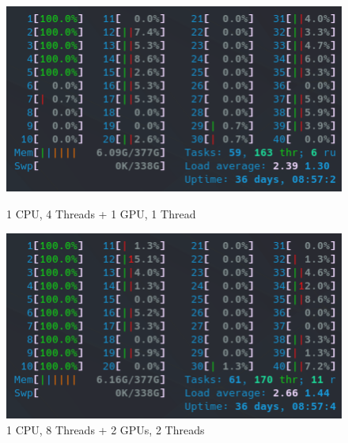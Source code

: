 \begin{figure}[!h]
    \centering
    \captionsetup{width=.48\linewidth}
    \begin{minipage}[t]{0.48\textwidth}
        \includegraphics[width=\textwidth]{figures/configurations/OMP/htop_hybrid/1CPU_4Threads___1GPU_1Thread.png}
        \caption{1 CPU, 4 Threads + 1 GPU, 1 Thread}\label{fig:1CPU_4Threads___1GPU_1Thread}
    \end{minipage}
    \hspace{0.4cm}
    \centering
    \captionsetup{width=.48\linewidth}
    \begin{minipage}[t]{0.48\textwidth}
        \includegraphics[width=\textwidth]{figures/configurations/OMP/htop_hybrid/1CPU_8Threads___2GPUs_2Threads.png}
        \caption{1 CPU, 8 Threads + 2 GPUs, 2 Threads}\label{fig:1CPU_8Threads___2GPUs_2Threads}
    \end{minipage}


\end{figure}
